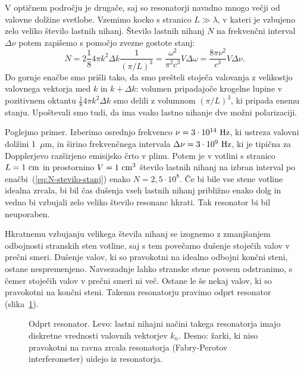 V optičnem področju je drugače, saj so resonatorji navadno mnogo večji
od valovne dolžine svetlobe. Vzemimo kocko s stranico $L\gg \lambda$, 
v kateri je vzbujeno zelo veliko število lastnih nihanj. Število lastnih nihanj $N$ 
na frekvenčni interval $\Delta \nu$ potem zapišemo s pomočjo zvezne gostote stanj:
\begin{equation}
N=2 \frac{1}{8} 4\pi k^{2}\Delta k \frac{1}{(\pi/L)^3}=\frac{\omega^{2}}{\pi^{2}c^{3}}V\Delta\omega=
\frac{8\pi \nu^{2}}{c^{3}}V\Delta\nu.
\label{eq:N-stevilo-stanj}
\end{equation}
Do gornje enačbe smo prišli tako, da smo prešteli stoječa valovanja z velikostjo
valovnega vektorja med $k$ in $k+\Delta k$: volumen pripadajoče krogelne lupine v pozitivnem oktantu
$\frac{1}{8} 4\pi k^{2}\Delta k$ smo delili z volumnom $(\pi/L)^3$, ki pripada enemu stanju. 
Upoštevali smo tudi, da ima vsako lastno nihanje dve možni polarizaciji.

Poglejmo primer. Izberimo osrednjo frekvenco $\nu=3\cdot10^{14}~\hertz$, ki
ustreza valovni dolžini 1~$\mu$m, in širino frekvenčnega
intervala $\Delta\nu=3\cdot10^{9}~\hertz$, ki je tipična za Dopplerjevo
razširjeno emisijsko črto v plinu. Potem je v votlini s stranico $L=1~\centi\metre$ 
in prostornino $V=1~\centi\metre^3$ število lastnih nihanj na izbran interval 
po enačbi~(\ref{eq:N-stevilo-stanj}) enako
$N=2,5\cdot10^{8}$. Če bi bile vse stene votline idealna zrcala,
bi bil čas dušenja vseh lastnih nihanj približno enako dolg in vedno bi vzbujali
zelo veliko število resonanc hkrati. Tak resonator bi bil neuporaben.

Hkratnemu vzbujanju velikega števila nihanj se izognemo z zmanjšanjem odbojnosti
stranskih sten votline, saj s tem povečamo dušenje stoječih valov v prečni smeri.
Dušenje valov, ki so pravokotni na idealno odbojni končni steni, ostane nespremenjeno.
Navsezadnje lahko stranske stene povsem odstranimo, s čemer stoječih valov v prečni smeri
ni več. Ostane le še nekaj valov, ki so pravokotni na končni
steni. Takemu resonatorju pravimo odprt resonator 
(slika~\ref{fig:Odprt_resonator}).\\
\begin{figure}[h]
\centering
\def\svgwidth{120truemm} 

\caption{Odprt resonator. Levo: lastni nihajni načini takega resonatorja imajo 
diskretne vrednosti valovnih vektorjev $k_{n}$. Desno: žarki, ki niso pravokotni na ravna zrcala
resonatorja (Fabry-Perotov interferometer) uidejo iz resonatorja.}
\label{fig:Odprt_resonator}
\end{figure}

